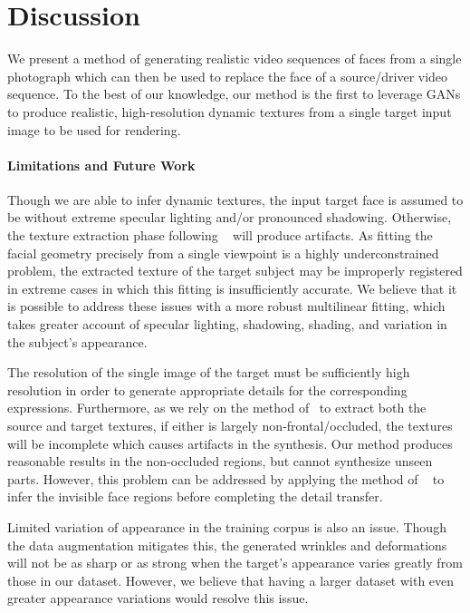 
\section{Discussion}

We present a method of generating realistic video sequences of faces from a single photograph 
which can then be used to replace the face of a source/driver video sequence. 
To the best of our knowledge, our method is the first
to leverage GANs to produce realistic, high-resolution dynamic textures from a single target input image to be used for rendering.  

\paragraph{Limitations and Future Work}
Though we are able to infer dynamic textures, the input target face is assumed to be without extreme specular lighting and/or pronounced shadowing. Otherwise, the texture extraction phase following ~\cite{f2f} will produce artifacts. As fitting the facial geometry precisely from a single viewpoint is a highly underconstrained problem, the extracted texture of the target subject may be improperly registered in extreme cases in which this fitting is insufficiently accurate. We believe that it is possible to address these issues with a more robust multilinear fitting, which takes greater account of specular lighting, shadowing, shading, and variation in the subject's appearance.   

The resolution of the single image of the target must be sufficiently high resolution in order to generate appropriate details for the corresponding expressions.  Furthermore, as we rely on the method of~\cite{f2f} to extract both the source and target textures, if either is largely non-frontal/occluded, the textures will be incomplete which causes artifacts in the synthesis.  Our method produces reasonable results in the non-occluded regions, but cannot synthesize unseen parts.  However, this problem can be addressed by applying the method of ~\cite{saito2016} to infer the invisible face regions before completing the detail transfer.  

Limited variation of appearance in the training corpus is also an issue.  Though the data augmentation mitigates this, the generated wrinkles and deformations will not be as sharp or as strong when the target's appearance varies greatly from those in our dataset.  However, we believe that having a larger dataset with even greater appearance variations would resolve this issue.

\vfill\eject

